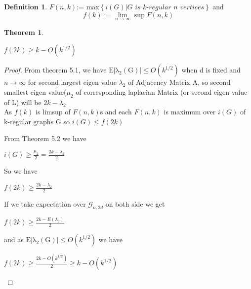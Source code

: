 \documentclass[oneside]{book}
\newtheorem{theorem}{Theorem}[section]
\theoremstyle{definition}
\newtheorem{mydef}{Definition}[chapter]
\begin{document}
 \begin{mydef}
 
 
$F(n, k)$:= max$\left\{i(G)| \textit{G is k-regular  n vertices} \right\}$ 
and
$$
f(k):=\lim _{n \rightarrow \infty} \sup F(n, k)
$$
\end{mydef}
 
 
\begin{theorem}
 
 
  \begin{center}
    $f(2 k) \geq k-O\left(k^{1 / 2}\right)$ 
     \end{center}
    \end{theorem}
   
   
\begin{proof} From theorem 5.1, we have  $\mathrm{E|\lambda_{2}(G)|}
    \leq O(k^{1/2})$ when d is fixed and $n\rightarrow \infty$ for second largest eigen value $\lambda_{2}$ of Adjacency Matrix A, so second smallest eigen value($\mu_{2}$ of corresponding laplacian Matrix (or second eigen value of L) will be $2k - \lambda_{2}$ \\
     
     
   As $f(k)$ is limsup of $F(n,k)$s and each $F(n,k)$ is maximum over $i(G)$ of k-regular graphs G
   so $i(G)\leq f(2k)$
   
    From Theorem 5.2 we have
    \begin{center}
        $i(G) \geq \frac{\mu_2}{2} = \frac{2k - \lambda_{2}}{2} $ 
    \end{center}
    So we have
    
    \begin{center}
        $ f(2k) \geq \frac{2k - \lambda_{2}}{2}$
    \end{center}
  
      If we take expectation over $\mathscr{G}_{n, 2 d}$ on both side we get 
      \begin{center}
           $ f(2k) \geq \frac{2k - E(\lambda_{2})}{2}$
      \end{center}
      and as $\mathrm{E|\lambda_{2}(G)|}
    \leq O(k^{1/2})$ we have 
 \begin{center}
    $f(2k) \geq \frac{2k - O(k^{1/2})}{2} \geq k - O(k^{1/2}) $ 
 \end{center}
    
  \end{proof}  
    
\end{document}
